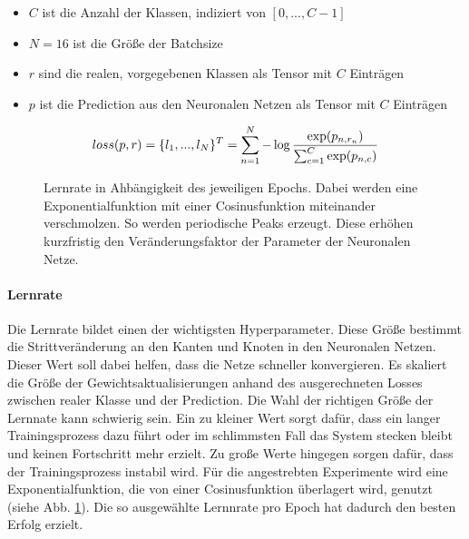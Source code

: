 \vspace{-0.2cm}

\begin{itemize}
  \setlength\itemsep{-0.5em}
\item $C$ ist die Anzahl der Klassen, indiziert von $[0, ..., C-1]$
\item $N = 16$ ist die Größe der Batchsize
\item $r$ sind die realen, vorgegebenen Klassen als Tensor mit $C$ Einträgen
\item $p$ ist die Prediction aus den Neuronalen Netzen als Tensor mit $C$ Einträgen
\end{itemize}

\vspace{-0.5cm}

\begin{equation}\centering
loss(p, r) = \{l_1, ... ,l_N\}^T = \sum_{n=1}^N {- \log \frac{\exp(p_{n,r_n})}{\sum_{c=1}^C \exp(p_{n,c})}}
\label{eq:loss}
\end{equation}

\begin{figure}[!b]\vspace{-1cm}\centering
\makebox[0pt]{}
\caption[Lernrate in Ahbängigkeit des jeweiligen Epochs]{Lernrate in Ahbängigkeit des jeweiligen Epochs. Dabei werden eine Exponentialfunktion mit einer Cosinusfunktion miteinander verschmolzen. So werden periodische Peaks erzeugt. Diese erhöhen kurzfristig den Veränderungsfaktor der Parameter der Neuronalen Netze.}\label{cap:lrrate}
\end{figure}\label{fig:lrrate}

\paragraph{Lernrate} Die Lernrate bildet einen der wichtigsten Hyperparameter. Diese Größe bestimmt die Strittveränderung an den Kanten und Knoten in den Neuronalen Netzen. Dieser Wert soll dabei helfen, dass die Netze schneller konvergieren. Es skaliert die Größe der Gewichtsaktualisierungen anhand des ausgerechneten Losses zwischen realer Klasse und der Prediction. Die Wahl der richtigen Größe der Lernnate kann schwierig sein. Ein zu kleiner Wert sorgt dafür, dass ein langer Trainingsprozess dazu führt oder im schlimmsten Fall das System stecken bleibt und keinen Fortschritt mehr erzielt. Zu große Werte hingegen sorgen dafür, dass der Trainingsprozess instabil wird. Für die angestrebten Experimente wird eine Exponentialfunktion, die von einer Cosinusfunktion überlagert wird, genutzt (siehe Abb. \ref{cap:lrrate}). Die so ausgewählte Lernnrate pro Epoch hat dadurch den besten Erfolg erzielt.





